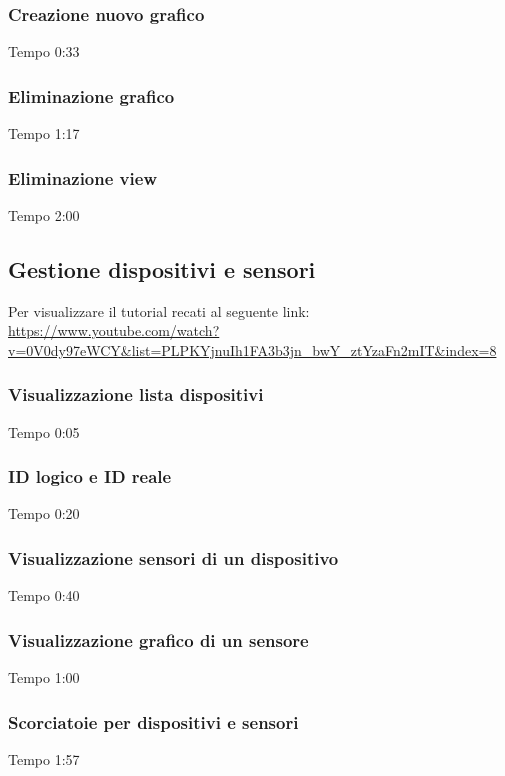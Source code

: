 	\subsubsection{Creazione nuovo grafico}
	Tempo 0:33

	\subsubsection{Eliminazione grafico}
	Tempo 1:17

	\subsubsection{Eliminazione view}
	Tempo 2:00

\subsection{Gestione dispositivi e sensori}
Per visualizzare il tutorial recati al seguente link: 
\url{https://www.youtube.com/watch?v=0V0dy97eWCY&list=PLPKYjnuIh1FA3b3jn_bwY_ztYzaFn2mIT&index=8}

	\subsubsection{Visualizzazione lista dispositivi}
	Tempo 0:05

	\subsubsection{ID logico e ID reale}
	Tempo 0:20

	\subsubsection{Visualizzazione sensori di un dispositivo}
	Tempo 0:40

	\subsubsection{Visualizzazione grafico di un sensore}
	Tempo 1:00

	\subsubsection{Scorciatoie per dispositivi e sensori}
	Tempo 1:57

